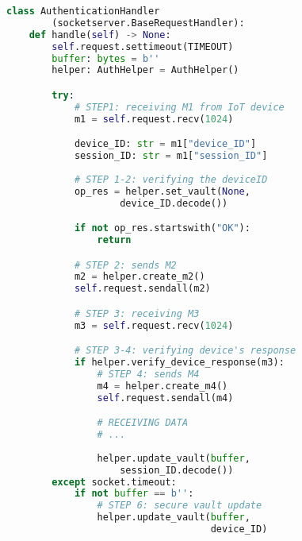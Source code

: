\begin{lstlisting}[language=Python, basicstyle=\small, label={lst:server}, caption=Server logic]
    class AuthenticationHandler
        (socketserver.BaseRequestHandler):
    def handle(self) -> None:
        self.request.settimeout(TIMEOUT)
        buffer: bytes = b''
        helper: AuthHelper = AuthHelper()

        try:
            # STEP1: receiving M1 from IoT device
            m1 = self.request.recv(1024)

            device_ID: str = m1["device_ID"]
            session_ID: str = m1["session_ID"]
            
            # STEP 1-2: verifying the deviceID
            op_res = helper.set_vault(None, 
                    device_ID.decode())

            if not op_res.startswith("OK"):
                return

            # STEP 2: sends M2
            m2 = helper.create_m2()
            self.request.sendall(m2)

            # STEP 3: receiving M3
            m3 = self.request.recv(1024)

            # STEP 3-4: verifying device's response
            if helper.verify_device_response(m3):
                # STEP 4: sends M4
                m4 = helper.create_m4() 
                self.request.sendall(m4)

                # RECEIVING DATA
                # ...
                
                helper.update_vault(buffer, 
                    session_ID.decode())
        except socket.timeout:
            if not buffer == b'':
                # STEP 6: secure vault update
                helper.update_vault(buffer, 
                                    device_ID)
\end{lstlisting}